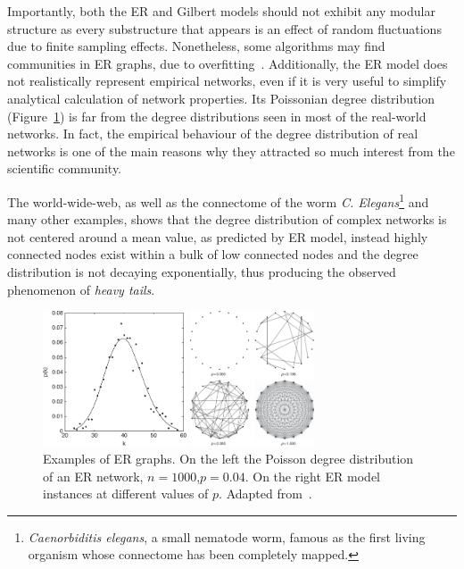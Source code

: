 \documentclass[11pt,              a4paper,              twoside,openright,              titlepage,              headinclude,footinclude,                            numbers=noenddot,              cleardoublepage=empty,]{scrreprt}
\begin{document}
Importantly, both the ER and Gilbert models should not exhibit any modular structure as every substructure that appears is an effect of random fluctuations due to finite sampling effects. Nonetheless, some algorithms may find communities in ER graphs, due to overfitting~\cite{guimera2004}.
Additionally, the ER model does not realistically represent empirical networks, even if it is very useful to simplify analytical calculation of network properties.
Its Poissonian degree distribution (Figure~\ref{fig:deg_dist_poisson_er}) is far from the degree distributions seen in most of the real-world networks.
In fact, the empirical behaviour of the degree distribution of real networks is one of the main reasons why they attracted so much interest from the scientific community.

The world-wide-web, as well as the connectome of the worm \emph{C.
Elegans}\footnote{\emph{Caenorbiditis elegans}, a small nematode worm, famous as the first living organism whose connectome has been completely mapped.} and many other examples, shows that the degree distribution of complex networks is not centered around a mean value, as predicted by ER model, instead highly connected nodes exist within a bulk of low connected nodes and the degree distribution is not decaying exponentially, thus producing the observed phenomenon of \emph{heavy tails}.
\begin{figure}
\centering
\begin{minipage}[b]{0.5\textwidth}\centering
\includegraphics[height=4cm]{images/deg_dist_poisson_er.pdf}
\end{minipage}\noindent
\begin{minipage}[b]{0.5\textwidth}\centering
\includegraphics[height=4cm]{images/er_graphs.pdf}
\end{minipage}
\caption{Examples of ER graphs.
On the left the Poisson degree distribution of an ER network, $n=1000$,$p=0.04$.
On the right ER model instances at different values of $p$.
Adapted from~\cite{estrada2011}.}
\label{fig:deg_dist_poisson_er}
\end{figure}
\end{document}
